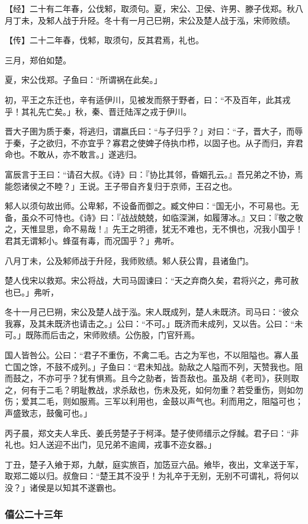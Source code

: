 \documentclass[]{article}
\begin{document}
【经】二十有二年春，公伐邾，取须句。夏，宋公、卫侯、许男、滕子伐郑。秋八月丁未，及邾人战于升陉。冬十有一月己巳朔，宋公及楚人战于泓，宋师败绩。

【传】二十二年春，伐邾，取须句，反其君焉，礼也。

三月，郑伯如楚。

夏，宋公伐郑。子鱼曰：``所谓祸在此矣。」

初，平王之东迁也，辛有适伊川，见被发而祭于野者，曰：``不及百年，此其戎乎！其礼先亡矣。」秋，秦、晋迁陆浑之戎于伊川。

晋大子圉为质于秦，将逃归，谓嬴氏曰：``与子归乎？」对曰：``子，晋大子，而辱于秦，子之欲归，不亦宜乎？寡君之使婢子侍执巾栉，以固子也。从子而归，弃君命也。不敢从，亦不敢言。」遂逃归。

富辰言于王曰：``请召大叔。《诗》曰：『协比其邻，昏姻孔云。』吾兄弟之不协，焉能怨诸侯之不睦？」王说。王子带自齐复归于京师，王召之也。

邾人以须句故出师。公卑邾，不设备而御之。臧文仲曰：``国无小，不可易也。无备，虽众不可恃也。《诗》曰：『战战兢兢，如临深渊，如履薄冰。』又曰：『敬之敬之，天惟显思，命不易哉！』先王之明德，犹无不难也，无不惧也，况我小国乎！君其无谓邾小。蜂虿有毒，而况国乎？」弗听。

八月丁未，公及邾师战于升陉，我师败绩。邾人获公胄，县诸鱼门。

楚人伐宋以救郑。宋公将战，大司马固谏曰：``天之弃商久矣，君将兴之，弗可赦也已。」弗听，

冬十一月己巳朔，宋公及楚人战于泓。宋人既成列，楚人未既济。司马曰：``彼众我寡，及其未既济也请击之。」公曰：``不可。」既济而未成列，又以告。公曰：``未可。」既陈而后击之，宋师败绩。公伤股，门官歼焉。

国人皆咎公。公曰：``君子不重伤，不禽二毛。古之为军也，不以阻隘也。寡人虽亡国之馀，不鼓不成列。」子鱼曰：``君未知战。勍敌之人隘而不列，天赞我也。阻而鼓之，不亦可乎？犹有惧焉。且今之勍者，皆吾敌也。虽及胡《老司》，获则取之，何有于二毛？明耻教战，求杀敌也，伤未及死，如何勿重？若受重伤，则如勿伤；爱其二毛，则如服焉。三军以利用也，金鼓以声气也。利而用之，阻隘可也；声盛致志，鼓儳可也。」

丙子晨，郑文夫人芈氏、姜氏劳楚子于柯泽。楚子使师缙示之俘馘。君子曰：``非礼也。妇人送迎不出门，见兄弟不逾阈，戎事不迩女器。」

丁丑，楚子入飨于郑，九献，庭实旅百，加笾豆六品。飨毕，夜出，文芈送于军，取郑二姬以归。叔詹曰：``楚王其不没乎！为礼卒于无别，无别不可谓礼，将何以没？」诸侯是以知其不遂霸也。

\hypertarget{header-n894}{%
\subsubsection{僖公二十三年 }\label{header-n894}}
\end{document}
